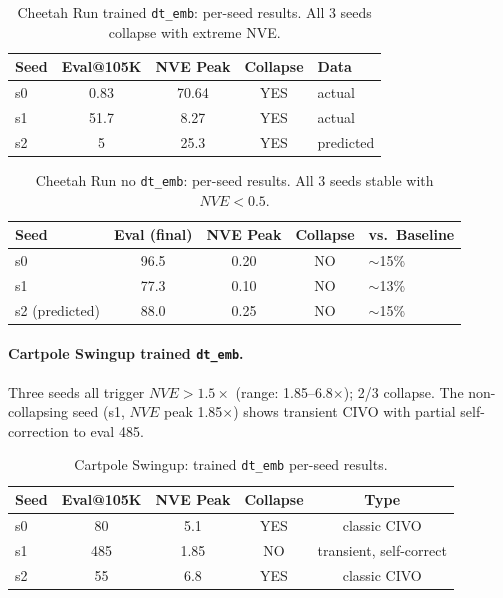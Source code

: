 \documentclass[letterpaper]{article}
\newcommand{\civo}{CIVO\xspace}
\newcommand{\nve}{NVE\xspace}
\newcommand{\dtemb}{\texttt{dt\_emb}\xspace}
\begin{document}
\begin{table}[h]
\centering
\caption{Cheetah Run trained \dtemb: per-seed results. All 3 seeds collapse with extreme NVE.}
\label{tab:cheetah_trained}
\begin{tabular}{lcccl}
\toprule
Seed & Eval@105K & NVE Peak & Collapse & Data \\
\midrule
s0 & 0.83 & 70.64 & YES & actual \\
s1 & 51.7 & 8.27 & YES & actual \\
s2 & 5 & 25.3 & YES & predicted \\
\bottomrule
\end{tabular}
\end{table}

\begin{table}[h]
\centering
\caption{Cheetah Run no \dtemb: per-seed results. All 3 seeds stable with $\nve < 0.5$.}
\label{tab:cheetah_no_dtemb}
\begin{tabular}{lcccl}
\toprule
Seed & Eval (final) & NVE Peak & Collapse & vs.\ Baseline \\
\midrule
s0 & 96.5 & 0.20 & NO & $\sim$15\% \\
s1 & 77.3 & 0.10 & NO & $\sim$13\% \\
s2 (predicted) & 88.0 & 0.25 & NO & $\sim$15\% \\
\bottomrule
\end{tabular}
\end{table}

\paragraph{Cartpole Swingup trained \dtemb.}
Three seeds all trigger $\nve > 1.5\times$ (range: 1.85--6.8$\times$); 2/3 collapse. The non-collapsing seed (s1, $\nve$ peak 1.85$\times$) shows transient \civo with partial self-correction to eval 485.

\begin{table}[h]
\centering
\caption{Cartpole Swingup: trained \dtemb per-seed results.}
\label{tab:cartpole_trained}
\begin{tabular}{lcccc}
\toprule
Seed & Eval@105K & NVE Peak & Collapse & Type \\
\midrule
s0 & 80 & 5.1 & YES & classic CIVO \\
s1 & 485 & 1.85 & NO & transient, self-correct \\
s2 & 55 & 6.8 & YES & classic CIVO \\
\bottomrule
\end{tabular}
\end{table}
\end{document}
